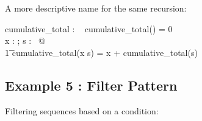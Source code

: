 \documentclass[a4paper,10pt,fleqn]{article}
\begin{document}
\noindent A more descriptive name for the same recursion:

\bigskip

\begin{axdef}
cumulative\_total : \seq~\nat \fun \nat
\where
cumulative\_total(\langle \rangle) = 0 \\
\forall x : \nat; s : \seq~\nat @ \\
\t1 cumulative\_total(\langle x \rangle \cat s) = x + cumulative\_total(s)
\end{axdef}

\subsection*{Example 5 : Filter Pattern}

\noindent Filtering sequences based on a condition:

\bigskip

\end{document}
